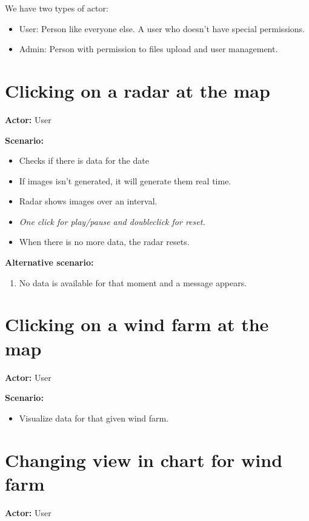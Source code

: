 We have two types of actor:
\begin{itemize}
\item User: Person like everyone else. A user who doesn't have special permissions.
\item Admin: Person with permission to files upload and user management.
\end{itemize}

\section{Clicking on a radar at the map}
\textbf{Actor:} User

\textbf{Scenario:}
\begin{itemize}
\item Checks if there is data for the date
\item If images isn't generated, it will generate them real time.
\item Radar shows images over an interval.
\item \emph{One click for play/pause and doubleclick for reset.}
\item When there is no more data, the radar resets.
\end{itemize}
\textbf{Alternative scenario:} 
\begin{enumerate}
\item No data is available for that moment and a message appears.
\end{enumerate}

\section{Clicking on a wind farm at the map}
\textbf{Actor:} User

\textbf{Scenario:}
\begin{itemize}
\item Visualize data for that given wind farm.
\end{itemize}

\section{Changing view in chart for wind farm}
\textbf{Actor:} User


